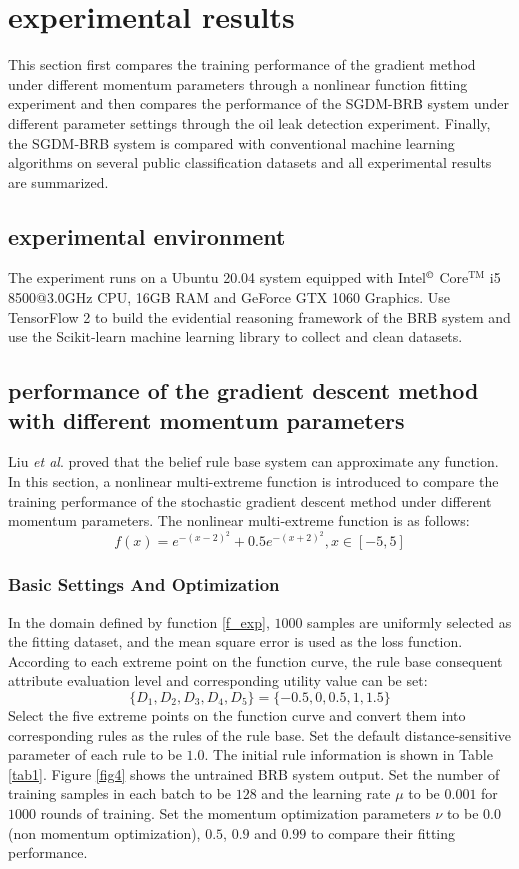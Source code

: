 \documentclass{ieeeaccess}
\begin{document}
\section{experimental results}
This section first compares the training performance of the gradient method under different momentum parameters through a nonlinear function fitting experiment
and then compares the performance of the SGDM-BRB system under different parameter settings through the oil leak detection experiment.
Finally, the SGDM-BRB system is compared with conventional machine learning algorithms on several public classification datasets and all experimental results are summarized.

\subsection{experimental environment}
The experiment runs on a Ubuntu 20.04 system equipped with Intel$^{\copyright}$ Core$^{\text{TM}}$ i5 8500@3.0GHz CPU, 16GB RAM and GeForce GTX 1060 Graphics.
Use TensorFlow 2 to build the evidential reasoning framework of the BRB system and use the Scikit-learn machine learning library to collect and clean datasets.

\subsection{performance of the gradient descent method with different momentum parameters}
Liu \textit{et al}.\cite{a16} proved that the belief rule base system can approximate any function.
In this section, a nonlinear multi-extreme function is introduced to compare the training performance of the stochastic gradient descent method under different momentum parameters.
The nonlinear multi-extreme function is as follows:
\begin{equation}
    f(x)=e^{-(x-2)^2}+0.5e^{-(x+2)^2},x\in[-5,5]
    \label{f_exp}
\end{equation}

\subsubsection{Basic Settings And Optimization}
In the domain defined by function \eqref{f_exp}, $1000$ samples are uniformly selected as the fitting dataset, and the mean square error is used as the loss function.
According to each extreme point on the function curve, the rule base consequent attribute evaluation level and corresponding utility value can be set:
$$\{D_1,D_2,D_3,D_4,D_5\}=\{-0.5,0,0.5,1,1.5\}$$
Select the five extreme points on the function curve and convert them into corresponding rules as the rules of the rule base.
Set the default distance-sensitive parameter of each rule to be $1.0$.
The initial rule information is shown in Table \ref{tab1}. Figure \ref{fig4} shows the untrained BRB system output.
Set the number of training samples in each batch to be $128$ and the learning rate $\mu$ to be $0.001$ for $1000$ rounds of training.
Set the momentum optimization parameters $\nu$ to be 0.0 (non momentum optimization), $0.5$, $0.9$ and $0.99$ to compare their fitting performance.
\end{document}
